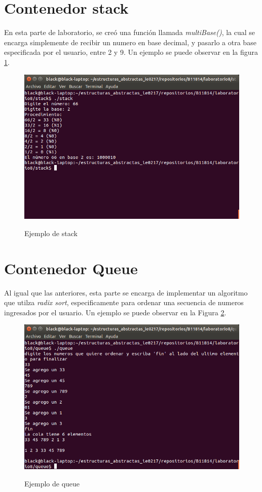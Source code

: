 \documentclass{article}
\begin{document}
\section{Contenedor stack}
En esta parte de laboratorio, se cre\' o una funci\' on llamada \textit{multiBase()}, la cual se encarga simplemente de recibir un numero en base decimal, y pasarlo a otra base especificada por el usuario, entre 2 y 9. Un ejemplo se puede observar en la figura \ref{fig:stack}.
\begin{figure}[hbtp]
\caption{Ejemplo de stack}
\centering
\includegraphics[scale=0.61]{imagenes/stack.png}
\label{fig:stack}
\end{figure}

\section{Contenedor Queue}
Al igual que las anteriores, esta parte se encarga de implementar un algoritmo que utilza \textit{radix sort}, especificamente para ordenar una secuencia de numeros ingresados por el usuario. Un ejemplo se puede observar en la Figura \ref{fig:queue}.

\begin{figure}[hbtp]
\caption{Ejemplo de queue}
\centering
\includegraphics[scale=0.6]{imagenes/queue.png}
\label{fig:queue}
\end{figure}
\end{document}

